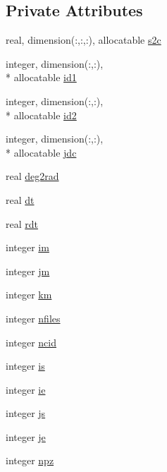 \subsection*{Private Attributes}
\begin{DoxyCompactItemize}
\item 
real, dimension(\-:,\-:,\-:), allocatable \hyperlink{classfv__iau__mod_a0967901620cb181a32bcb765735ca893}{s2c}
\item 
integer, dimension(\-:,\-:), \\*
allocatable \hyperlink{classfv__iau__mod_af29c8a827572b31a036d0abdf9e069ce}{id1}
\item 
integer, dimension(\-:,\-:), \\*
allocatable \hyperlink{classfv__iau__mod_a58dd6dc94c1c0d8573764ea8a8dbf8fe}{id2}
\item 
integer, dimension(\-:,\-:), \\*
allocatable \hyperlink{classfv__iau__mod_a41ed3fc692c4d53ad905c7bb685ef4a0}{jdc}
\item 
real \hyperlink{classfv__iau__mod_ac636879eb6bdbeee409bbd34c6658035}{deg2rad}
\item 
real \hyperlink{classfv__iau__mod_aa09091f1f91b28a3137ebc5f59c654aa}{dt}
\item 
real \hyperlink{classfv__iau__mod_a60ee6932472e1de9516db019295fd7d1}{rdt}
\item 
integer \hyperlink{classfv__iau__mod_af1d250bc9006235754621652e834c674}{im}
\item 
integer \hyperlink{classfv__iau__mod_a6c78ca52b83ca9f3e6045d9f06f889bc}{jm}
\item 
integer \hyperlink{classfv__iau__mod_a59eb624f87e12b21694f85684d1c89b7}{km}
\item 
integer \hyperlink{classfv__iau__mod_a756fe43c3f4a450d555fc78eef47d82d}{nfiles}
\item 
integer \hyperlink{classfv__iau__mod_a723f72c8cff32995d1dcd3a7f2661df2}{ncid}
\item 
integer \hyperlink{classfv__iau__mod_afb1c5125d4ad50603b747abd8e2cfd66}{is}
\item 
integer \hyperlink{classfv__iau__mod_af5515c4fa4f895ab74405846237a057b}{ie}
\item 
integer \hyperlink{classfv__iau__mod_a8cfba167a9bf88f42967b9bb5644443c}{js}
\item 
integer \hyperlink{classfv__iau__mod_a3a77635e7bb49d54f620f47019277693}{je}
\item 
integer \hyperlink{classfv__iau__mod_aaf9ea7c9b134626a73380e7fdd86e42d}{npz}

\end{DoxyCompactItemize}
